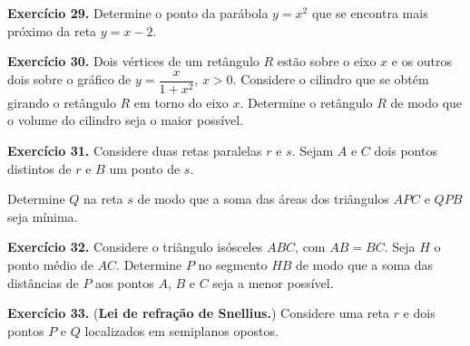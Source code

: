 \documentclass[12pt,a4paper]{article}
\begin{document}
\vspace{0.5cm}
\noindent\textbf{Exercício 29.} Determine o ponto da parábola $y = x^2$ que se encontra mais próximo da reta $y = x - 2$.

\vspace{0.5cm}
\noindent\textbf{Exercício 30.} Dois vértices de um retângulo $R$ estão sobre o eixo $x$ e os outros dois sobre o gráfico de $y = \dfrac{x}{1 + x^2}$, $x > 0$. Considere o cilindro que se obtém girando o retângulo $R$ em torno do eixo $x$. Determine o retângulo $R$ de modo que o volume do cilindro seja o maior possível.

\vspace{0.5cm}
\noindent\textbf{Exercício 31.} Considere duas retas paralelas $r$ e $s$. Sejam $A$ e $C$ dois pontos distintos de $r$ e $B$ um ponto de $s$.

\begin{center}
\end{center}

\noindent Determine $Q$ na reta $s$ de modo que a soma das áreas dos triângulos $APC$ e $QPB$ seja mínima.

\vspace{0.5cm}
\noindent\textbf{Exercício 32.} Considere o triângulo isósceles $ABC$, com $AB = BC$. Seja $H$ o ponto médio de $AC$. Determine $P$ no segmento $HB$ de modo que a soma das distâncias de $P$ aos pontos $A$, $B$ e $C$ seja a menor possível.

\vspace{0.5cm}
\noindent\textbf{Exercício 33.} (\textbf{Lei de refração de Snellius.}) Considere uma reta $r$ e dois pontos $P$ e $Q$ localizados em semiplanos opostos.
\end{document}

